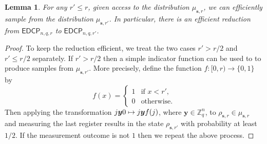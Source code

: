 \documentclass[11pt]{article}
\theoremstyle{plain}
\newtheorem{lemma}[theorem]{Lemma}
\theoremstyle{definition}
\let\ket\relax
\DeclarePairedDelimiter{\ket}{\lvert}{\rangle}
\def\Z{\mathbb{Z}}
\def\edcp{\mathsf{EDCP}}
\begin{document}
\begin{lemma}
    \label{lem:self-rd}
    For any $r' \le r$, given access to the distribution $\mu_{\bm{s}, r}$, we can efficiently sample from the distribution $\mu_{\bm{s}, r'}$. In particular, there is an efficient reduction from $\edcp_{n, q, r}$ to $\edcp_{n, q, r'}$.
\end{lemma}
\begin{proof}
    To keep the reduction efficient, we treat the two cases $r' > r / 2$ and $r' \le r / 2$ separately. If $r' > r / 2$ then a simple indicator function can be used to to produce samples from $\mu_{\bm{s}, r'}$. More precisely, define the function $f: [0, r) \rightarrow \{ 0, 1 \}$ by
    \[ f(x) = 
    \begin{cases}
        1 & \text{if } x < r', \\
        0 & \text{otherwise}.
    \end{cases} \]
    Then applying the transformation $\ket{j}\ket{\bm{y}}\ket{0} \mapsto \ket{j}\ket{\bm{y}}\ket{f(j)}$, where $\bm{y} \in \Z_q^n$, to $\rho_{\bm{s}, r} \in \mu_{\bm{s}, r}$ and measuring the last register results in the state $\rho_{\bm{s}, r'}$ with probability at least $1 / 2$. If the measurement outcome is not $1$ then we repeat the above process.


\end{proof}
\end{document}
